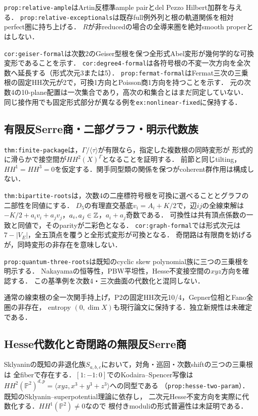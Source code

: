 \documentclass[11pt,a4paper]{ltjsarticle}
\begin{document}
\texttt{prop:relative-ample}はArtin反標準ample pairとdel Pezzo Hilbert加群を与える．
\texttt{prop:relative-exceptionals}は既存full例外列と根の軌道関係を相対perfect圏に持ち上げる．
$R$が非reducedの場合の全導来圏を絶対smooth properとはしない．

\texttt{cor:geiser-formal}は次数2のGeiser型根を保つ全形式Abel変形が幾何学的な可換変形であることを示す．
\texttt{cor:degree4-formal}は各符号根の不変一次方向を全次数へ延長する（形式次元3または5）．
\texttt{prop:fermat-formal}はFermat三次の三乗根の固定HH次元が2で，可換1方向とPoisson商1方向を持つことを示す．
元の次数4の10-plane配置は一次集合であり，高次の和集合とはまだ同定していない．
同じ接作用でも固定形式部分が異なる例を\texttt{ex:nonlinear-fixed}に保持する．

\subsection{有限反Serre商・二部グラフ・明示代数族}
\texttt{thm:finite-package}は，$\Gamma/\langle\tau\rangle$が有限なら，指定した複数根の同時変形が
形式的に滑らかで接空間が$HH^2(X)^\Gamma$となることを証明する．
前節と同じtilting，$HH^1=HH^3=0$を仮定する．関手同型類の関係を保つがcoherent群作用は構成しない．

\texttt{thm:bipartite-roots}は，次数4の二座標符号根を可換に選べることとグラフの二部性を同値にする．
$D_5$の有理直交基底$v_i=A_i+K/2$で，辺$ij$の全線束解は
$-K/2+a_iv_i+a_jv_j$，$a_i,a_j\in\mathbb Z$，$a_i+a_j$奇数である．
可換性は共有頂点係数の一致と同値で，そのparityが二彩色となる．
\texttt{cor:graph-formal}では形式次元は$7-|V_E|$，全五頂点を覆うと全形式変形が可換となる．
奇閉路は有限商を妨げるが，同時変形の非存在を意味しない．

\texttt{prop:quantum-three-roots}は既知のcyclic skew polynomial族に三つの三乗根を明示する．
Nakayamaの恒等性，PBW平坦性，Hesse不変接空間の$xyz$方向を確認する．
この基準例を次数4・三次曲面の代数化と混同しない．

通常の線束根の全一次関手持上げ，P2の固定HH次元10/4，Gepner位相とFano全圏の非存在，
entropy $(0,\dim X)$も現行論文に保持する．独立新規性は未確定である．

\subsection{Hesse代数化と奇閉路の無限反Serre商}
Sklyaninの既知の非退化族$S_{a,b,c}$において，対角・巡回・次数shiftの三つの三乗根は
全fiberで存在する．$[1:-1:0]$でのKodaira--Spencer写像は
$HH^2(\mathbb P^2)^{d,p}=\langle xyz,x^3+y^3+z^3\rangle$への同型である
（\texttt{prop:hesse-two-param}）．既知のSklyanin--superpotential理論に依存し，
二次元Hesse不変方向を実際に代数化する．$HH^1(\mathbb P^2)\ne0$なので
根付きmoduliの形式普遍性は未証明である．
\end{document}
